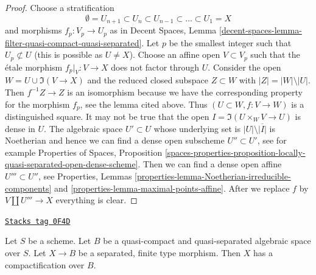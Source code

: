 \begin{proof}
Choose a stratification
$$
\emptyset = U_{n + 1} \subset
U_n \subset U_{n - 1} \subset \ldots \subset U_1 = X
$$
and morphisms $f_p : V_p \to U_p$ as in Decent Spaces, Lemma
\ref{decent-spaces-lemma-filter-quasi-compact-quasi-separated}.
Let $p$ be the smallest integer such that $U_p \not \subset U$
(this is possible as $U \not = X$). Choose an affine open $V \subset V_p$
such that the \'etale morphism $f_p|_V : V \to X$ does not factor through $U$.
Consider the open $W = U \cup \Im(V \to X)$ and the
reduced closed subspace $Z \subset W$ with $|Z| = |W| \setminus |U|$.
Then $f^{-1}Z \to Z$ is an isomorphism because we have the
corresponding property for the morphism $f_p$, see the lemma cited above.
Thus $(U \subset W, f : V \to W)$ is a distinguished square.
It may not be true that the open $I = \Im(U \times_W V \to U)$
is dense in $U$. The algebraic space $U' \subset U$ whose underlying
set is $|U| \setminus \overline{|I|}$ is Noetherian
and hence we can find a dense open subscheme $U'' \subset U'$, see
for example Properties of Spaces, Proposition
\ref{spaces-properties-proposition-locally-quasi-separated-open-dense-scheme}.
Then we can find a dense open affine $U''' \subset U''$, see
Properties, Lemmas \ref{properties-lemma-Noetherian-irreducible-components}
and \ref{properties-lemma-maximal-points-affine}.
After we replace $f$ by $V \amalg U''' \to X$ everything is clear.
\end{proof}

\begin{theorem}[Nagata]
\label{spaces-pushouts-theorem-nagata}
\href{https://stacks.math.columbia.edu/tag/0F4D}{\texttt{Stacks tag 0F4D}}

\begin{reference}
\cite{CLO}
\end{reference}
Let $S$ be a scheme. Let $B$ be a quasi-compact and quasi-separated
algebraic space over $S$. Let $X \to B$ be a separated, finite type morphism.
Then $X$ has a compactification over $B$.
\end{theorem}

